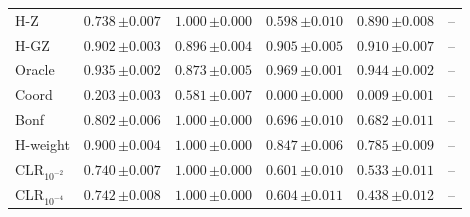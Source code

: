 \begin{tabular}{lccccc}
H-Z & $0.738\,{\scriptstyle\pm 0.007}$ & $1.000\,{\scriptstyle\pm 0.000}$ & $0.598\,{\scriptstyle\pm 0.010}$ & $0.890\,{\scriptstyle\pm 0.008}$ & -- \\
H-GZ & $0.902\,{\scriptstyle\pm 0.003}$ & $0.896\,{\scriptstyle\pm 0.004}$ & $0.905\,{\scriptstyle\pm 0.005}$ & $0.910\,{\scriptstyle\pm 0.007}$ & -- \\
Oracle & $0.935\,{\scriptstyle\pm 0.002}$ & $0.873\,{\scriptstyle\pm 0.005}$ & $0.969\,{\scriptstyle\pm 0.001}$ & $0.944\,{\scriptstyle\pm 0.002}$ & -- \\
Coord & $0.203\,{\scriptstyle\pm 0.003}$ & $0.581\,{\scriptstyle\pm 0.007}$ & $0.000\,{\scriptstyle\pm 0.000}$ & $0.009\,{\scriptstyle\pm 0.001}$ & -- \\
Bonf & $0.802\,{\scriptstyle\pm 0.006}$ & $1.000\,{\scriptstyle\pm 0.000}$ & $0.696\,{\scriptstyle\pm 0.010}$ & $0.682\,{\scriptstyle\pm 0.011}$ & -- \\
H-weight & $0.900\,{\scriptstyle\pm 0.004}$ & $1.000\,{\scriptstyle\pm 0.000}$ & $0.847\,{\scriptstyle\pm 0.006}$ & $0.785\,{\scriptstyle\pm 0.009}$ & -- \\
CLR$_{10^{-2}}$ & $0.740\,{\scriptstyle\pm 0.007}$ & $1.000\,{\scriptstyle\pm 0.000}$ & $0.601\,{\scriptstyle\pm 0.010}$ & $0.533\,{\scriptstyle\pm 0.011}$ & -- \\
CLR$_{10^{-4}}$ & $0.742\,{\scriptstyle\pm 0.008}$ & $1.000\,{\scriptstyle\pm 0.000}$ & $0.604\,{\scriptstyle\pm 0.011}$ & $0.438\,{\scriptstyle\pm 0.012}$ & -- \\
\bottomrule
\end{tabular}

